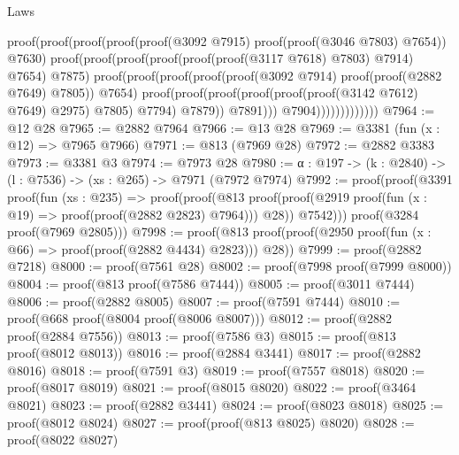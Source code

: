 \begin{lexlean}{Laws}
\begin{coremodule}
                                    proof(proof(proof(proof(proof(@3092 @7915)
                                              proof(proof(@3046 @7803) @7654))
                                            @7630)
                                          proof(proof(proof(proof(proof(proof(@3117 @7618) @7803)
                                                    @7914)
                                                  @7654)
                                                @7875)
                                              proof(proof(proof(proof(proof(@3092 @7914)
                                                        proof(proof(@2882 @7649) @7805))
                                                      @7654)
                                                    proof(proof(proof(proof(proof(proof(@3142 @7612)
                                                                @7649)
                                                              @2975)
                                                            @7805)
                                                          @7794)
                                                        @7879))
                                                  @7891)))
                                        @7904)))))))))))))
@7964 := @12 @28
@7965 := @2882 @7964
@7966 := @13 @28
@7969 := @3381 (fun (x : @12) => @7965 @7966)
@7971 := @813 (@7969 @28)
@7972 := @2882 @3383
@7973 := @3381 @3
@7974 := @7973 @28
@7980 := {α : @197} -> (k : @2840) -> (l : @7536) -> (xs : @265) -> @7971 (@7972 @7974)
@7992 := proof(proof(@3391
        proof(fun (xs : @235) =>
          proof(proof(@813
                proof(proof(@2919 proof(fun (x : @19) => proof(proof(@2882 @2823) @7964))) @28))
              @7542)))
      proof(@3284 proof(@7969 @2805)))
@7998 := proof(@813 proof(proof(@2950 proof(fun (x : @66) => proof(proof(@2882 @4434) @2823))) @28))
@7999 := proof(@2882 @7218)
@8000 := proof(@7561 @28)
@8002 := proof(@7998 proof(@7999 @8000))
@8004 := proof(@813 proof(@7586 @7444))
@8005 := proof(@3011 @7444)
@8006 := proof(@2882 @8005)
@8007 := proof(@7591 @7444)
@8010 := proof(@668 proof(@8004 proof(@8006 @8007)))
@8012 := proof(@2882 proof(@2884 @7556))
@8013 := proof(@7586 @3)
@8015 := proof(@813 proof(@8012 @8013))
@8016 := proof(@2884 @3441)
@8017 := proof(@2882 @8016)
@8018 := proof(@7591 @3)
@8019 := proof(@7557 @8018)
@8020 := proof(@8017 @8019)
@8021 := proof(@8015 @8020)
@8022 := proof(@3464 @8021)
@8023 := proof(@2882 @3441)
@8024 := proof(@8023 @8018)
@8025 := proof(@8012 @8024)
@8027 := proof(proof(@813 @8025) @8020)
@8028 := proof(@8022 @8027)

\end{coremodule}
\end{lexlean}
